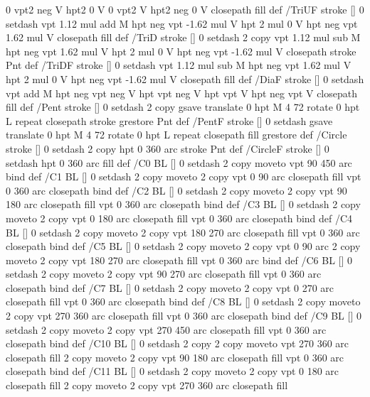 {{{  0 vpt2 neg V  hpt2 0 V  0 vpt2 V
  hpt2 neg 0 V  closepath fill } def
/TriUF { stroke [] 0 setdash vpt 1.12 mul add M
  hpt neg vpt -1.62 mul V
  hpt 2 mul 0 V
  hpt neg vpt 1.62 mul V closepath fill } def
/TriD { stroke [] 0 setdash 2 copy vpt 1.12 mul sub M
  hpt neg vpt 1.62 mul V
  hpt 2 mul 0 V
  hpt neg vpt -1.62 mul V closepath stroke
  Pnt  } def
/TriDF { stroke [] 0 setdash vpt 1.12 mul sub M
  hpt neg vpt 1.62 mul V
  hpt 2 mul 0 V
  hpt neg vpt -1.62 mul V closepath fill} def
/DiaF { stroke [] 0 setdash vpt add M
  hpt neg vpt neg V hpt vpt neg V
  hpt vpt V hpt neg vpt V closepath fill } def
/Pent { stroke [] 0 setdash 2 copy gsave
  translate 0 hpt M 4 {72 rotate 0 hpt L} repeat
  closepath stroke grestore Pnt } def
/PentF { stroke [] 0 setdash gsave
  translate 0 hpt M 4 {72 rotate 0 hpt L} repeat
  closepath fill grestore } def
/Circle { stroke [] 0 setdash 2 copy
  hpt 0 360 arc stroke Pnt } def
/CircleF { stroke [] 0 setdash hpt 0 360 arc fill } def
/C0 { BL [] 0 setdash 2 copy moveto vpt 90 450  arc } bind def
/C1 { BL [] 0 setdash 2 copy        moveto
       2 copy  vpt 0 90 arc closepath fill
               vpt 0 360 arc closepath } bind def
/C2 { BL [] 0 setdash 2 copy moveto
       2 copy  vpt 90 180 arc closepath fill
               vpt 0 360 arc closepath } bind def
/C3 { BL [] 0 setdash 2 copy moveto
       2 copy  vpt 0 180 arc closepath fill
               vpt 0 360 arc closepath } bind def
/C4 { BL [] 0 setdash 2 copy moveto
       2 copy  vpt 180 270 arc closepath fill
               vpt 0 360 arc closepath } bind def
/C5 { BL [] 0 setdash 2 copy moveto
       2 copy  vpt 0 90 arc
       2 copy moveto
       2 copy  vpt 180 270 arc closepath fill
               vpt 0 360 arc } bind def
/C6 { BL [] 0 setdash 2 copy moveto
      2 copy  vpt 90 270 arc closepath fill
              vpt 0 360 arc closepath } bind def
/C7 { BL [] 0 setdash 2 copy moveto
      2 copy  vpt 0 270 arc closepath fill
              vpt 0 360 arc closepath } bind def
/C8 { BL [] 0 setdash 2 copy moveto
      2 copy vpt 270 360 arc closepath fill
              vpt 0 360 arc closepath } bind def
/C9 { BL [] 0 setdash 2 copy moveto
      2 copy  vpt 270 450 arc closepath fill
              vpt 0 360 arc closepath } bind def
/C10 { BL [] 0 setdash 2 copy 2 copy moveto vpt 270 360 arc closepath fill
       2 copy moveto
       2 copy vpt 90 180 arc closepath fill
               vpt 0 360 arc closepath } bind def
/C11 { BL [] 0 setdash 2 copy moveto
       2 copy  vpt 0 180 arc closepath fill
       2 copy moveto
       2 copy  vpt 270 360 arc closepath fill
}}}
